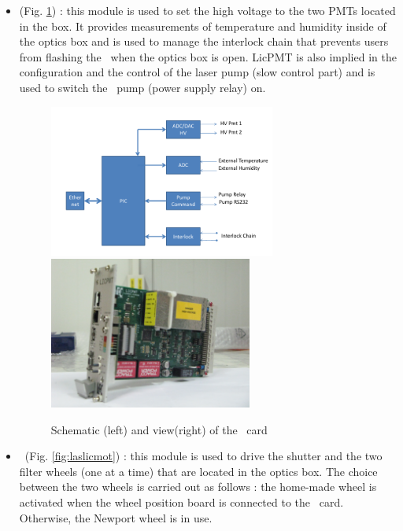 \begin{itemize}

\item \licpmt (Fig. \ref{fig:laslicpmt}) : this module is used to set the high voltage to the two PMTs located in the box. It provides measurements of temperature and humidity inside of the optics box and is used to manage the interlock chain that prevents users from flashing the \laser~when the optics box is open. LicPMT is also implied in the configuration and the control of the laser pump (slow control part) and is used to switch the \laser~pump (power supply relay) on. 

\begin{figure}[htbp]
\centering
\includegraphics[height=5cm]{figures/licpmt_scheme.pdf}
\includegraphics[height=5cm]{figures/licpmt.JPG}
\caption{Schematic (left) and view(right) of the \licpmt~card}\label{fig:laslicpmt}
\end{figure}

\item \licmot~(Fig. \ref{fig:laslicmot}) : this module is used to drive the shutter and the two filter wheels (one at a time) that are located in the optics box. The choice between the two wheels is carried out as follows : the home-made wheel is activated when the wheel position board is connected to the \licmot~card. Otherwise, the Newport wheel is in use.


\end{itemize}
